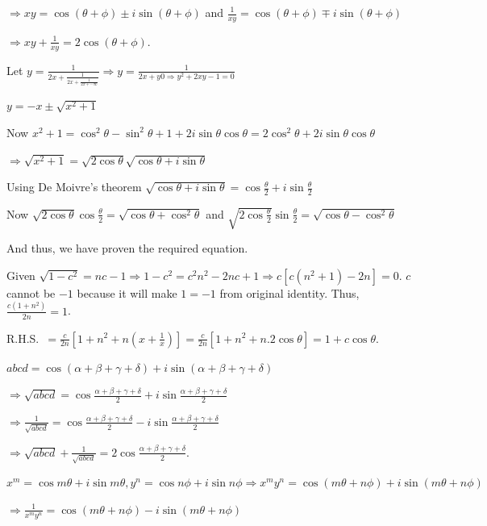   $\Rightarrow xy = \cos(\theta + \phi)\pm i\sin(\theta + \phi)$ and $\frac{1}{xy} = \cos(\theta + \phi)\mp
  i\sin(\theta + \phi)$

  $\Rightarrow xy + \frac{1}{xy} = 2 \cos(\theta + \phi)$.
\item Let $y = \frac{1}{2x + \frac{1}{2x + \frac{1}{2x  + \cdots \infty}}}\Rightarrow y = \frac{1}{2x +
  y0\Rightarrow y^2 + 2xy -1 = 0}$

  $y = -x \pm \sqrt{x^2 + 1}$

  Now $x^2 + 1 = \cos^2\theta - \sin^2\theta + 1 + 2i\sin\theta\cos\theta = 2\cos^2\theta +
  2i\sin\theta\cos\theta$

  $\Rightarrow \sqrt{x^2 + 1} = \sqrt{2\cos\theta}\sqrt{\cos\theta + i\sin\theta}$

  Using De Moivre's theorem $\sqrt{\cos\theta + i\sin\theta} = \cos\frac{\theta}{2} + i\sin\frac{\theta}{2}$

  Now $\sqrt{2\cos\theta}\cos\frac{\theta}{2} = \sqrt{\cos\theta + \cos^2\theta}$ and
  $\sqrt{2\cos\frac{\theta}{2}}\sin\frac{\theta}{2} = \sqrt{\cos\theta - \cos^2\theta}$

  And thus, we have proven the required equation.
\item Given $\sqrt{1 - c^2} = nc - 1\Rightarrow 1 - c^2 = c^2n^2 - 2nc + 1 \Rightarrow c[c(n^2 + 1) - 2n] =
  0$. $c$ cannot be $-1$ because it will make $1 = -1$ from original identity. Thus, $\frac{c(1 + n^2)}{2n}
  = 1$.

  R.H.S.\ $= \frac{c}{2n}\left[1 + n^2 + n\left(x + \frac{1}{x}\right)\right] = \frac{c}{2n}[1 +
    n^2 + n.2\cos\theta] = 1 + c\cos\theta$.
\item $abcd = \cos(\alpha + \beta + \gamma + \delta) + i\sin(\alpha + \beta + \gamma + \delta)$

  $\Rightarrow \sqrt{abcd} = \cos\frac{\alpha + \beta + \gamma + \delta}{2} + i\sin\frac{\alpha + \beta
  + \gamma + \delta}{2}$

  $\Rightarrow \frac{1}{\sqrt{abcd}} = \cos\frac{\alpha + \beta + \gamma + \delta}{2} - i\sin\frac{\alpha
  + \beta + \gamma + \delta}{2}$

  $\Rightarrow \sqrt{abcd} + \frac{1}{\sqrt{abcd}} = 2\cos\frac{\alpha + \beta + \gamma + \delta}{2}$.
\item $x^m = \cos m\theta + i\sin m\theta, y^n = \cos n\phi + i\sin n\phi \Rightarrow x^my^n = \cos(m\theta
  + n\phi) + i\sin(m\theta + n\phi)$

  $\Rightarrow \frac{1}{x^my^n} = \cos(m\theta + n\phi) - i\sin(m\theta + n\phi)$


